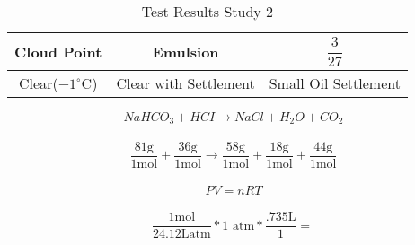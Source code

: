 \documentclass{article}
\newcommand\Tstrut{\rule{0pt}{3.6ex}}         %
\newcommand\Bstrut{\rule[-0.9ex]{0pt}{0pt}} \usepackage[margin=0.5in]{geometry}
\begin{document}
    \begin{longtable}[c]{| c |  c |  c |}
        \caption{Test Results Study 2 \label{long}}\\[.25in]
        \hline
        Cloud Point & Emulsion & $\dfrac{3}{27}$ \Tstrut\Bstrut \\[.1 in]
        \hline
        Clear($-1 ^{\circ}\mathrm{C}$) & Clear with Settlement & Small Oil Settlement \Tstrut\Bstrut \\[.1 in]
        \hline
    \end{longtable}
    \pagebreak
    $$NaHCO_{3} + HCI \rightarrow NaCl + H_{2}O + CO_{2}$$\\
    $$\dfrac{81 \si{\gram}}{1 \si{\mole}} + \dfrac{36 \si{\gram}}{1 \si{\mole}} \rightarrow \dfrac{58 \si{\gram}}{1 \si{\mole}} + \dfrac{18 \si{\gram}}{1 \si{\mole}} +  \dfrac{44 \si{\gram}}{1 \si{\mole}}$$\\
    $$PV = nRT$$\\
    $$\dfrac{1 \si{\mole}}{24.12 \si{\liter} \text{atm}} * \text{1 atm} * \dfrac{.735 \si{\liter}}{1} = \dfrac{}{} $$
\end{document}
